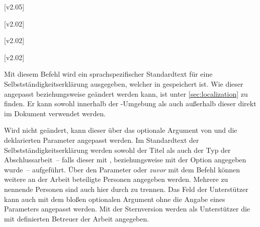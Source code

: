 \begin{DeclareEntity*}{}
\begin{DeclareEntity*}{}
\begin{DeclareEntity*}{}
\begin{Declaration}
  {}
\begin{Declaration}
  {}
  [v2.05]
\begin{Declaration}
  {}
\begin{Declaration}
  {}
\begin{Declaration}
  {}
\begin{Declaration}
  {}
\begin{Declaration}
  {}
  [v2.02]
\begin{Declaration}
  {}
  [v2.02]
\begin{Declaration}
  {}
  [v2.02]
\begin{Declaration}
  {}
\printdeclarationlist[Datum]

Mit diesem Befehl wird ein sprachspezifischer Standardtext für eine 
Selbstständigkeitserklärung ausgegeben, welcher in  
gespeichert ist. Wie dieser angepasst beziehungsweise geändert werden kann, ist 
unter \autoref{sec:localization} zu finden. Er kann sowohl innerhalb der 
-Umgebung als auch außerhalb dieser direkt im 
Dokument verwendet werden. 

Wird  nicht geändert, kann dieser über das optionale 
Argument von  und die deklarierten Parameter angepasst 
werden. Im Standardtext der Selbstständigkeitserklärung werden sowohl der Titel 
als auch der Typ der Abschlussarbeit~-- falls dieser mit , 
 beziehungsweise mit der 
Option  angegeben wurde~-- aufgeführt. Über den Parameter 
 oder \emph{zuvor} mit dem Befehl 
 können weitere an der Arbeit beteiligte Personen angegeben 
werden. Mehrere zu nennende Personen sind auch hier durch  zu 
trennen. Das Feld der Unterstützer kann auch mit dem bloßen optionalen Argument 
ohne die Angabe eines Parameters angepasst werden. 
%
Mit der Sternversion  werden als Unterstützer die mit 
 definierten Betreuer der Arbeit 
angegeben.


\end{Declaration}
\end{Declaration}
\end{Declaration}
\end{Declaration}
\end{Declaration}
\end{Declaration}
\end{Declaration}
\end{Declaration}
\end{Declaration}
\end{Declaration}
\end{DeclareEntity*}
\end{DeclareEntity*}
\end{DeclareEntity*}
